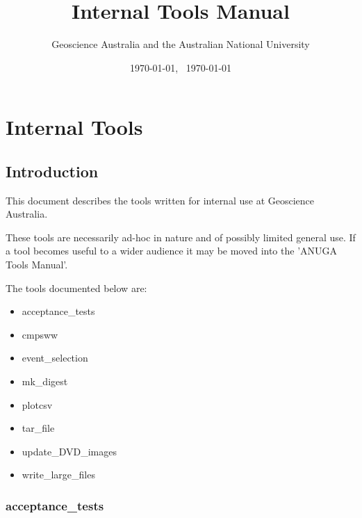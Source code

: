 \documentclass{manual}
\title{\anuga Internal Tools Manual}
\author{Geoscience Australia and the Australian National University}
\date{\today, \ \currenttime}
\date{\today} %
\begin{document}
\maketitle




\tableofcontents


\chapter{Internal Tools}


\section{Introduction}

This document describes the tools written for internal \anuga use at Geoscience Australia.

These tools are necessarily ad-hoc in nature and of possibly limited general use.  If
a tool becomes useful to a wider audience it may be moved into the 'ANUGA Tools Manual'.

The tools documented below are:
\begin{itemize}  
  \item acceptance_tests
  \item cmpsww
  \item event_selection
  \item mk_digest
  \item plotcsv
  \item tar_file
  \item update_DVD_images
  \item write_large_files
\end{itemize}   

\pagebreak

\subsection{acceptance_tests}
\label{subsec:acceptance_tests}
\end{document}
